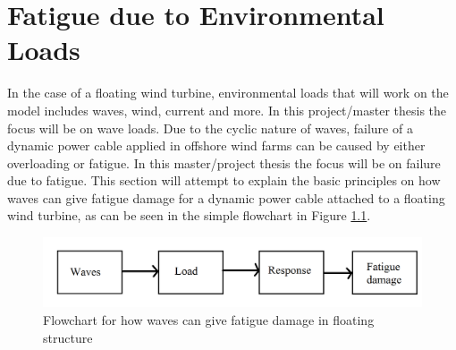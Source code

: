 \chapter{Fatigue due to Environmental Loads}
\label{chap:fatigue}
In the case of a floating wind turbine, environmental loads that will work on the model includes waves, wind, current and more. In this project/master thesis the focus will be on wave loads. Due to the cyclic nature of waves, failure of a dynamic power cable applied in offshore wind farms can be caused by either overloading or fatigue. In this master/project thesis the focus will be on failure due to fatigue. This section will attempt to explain the basic principles on how waves can give fatigue damage for a dynamic power cable attached to a floating wind turbine, as can be seen in the simple flowchart in Figure \ref{fig:flowchart}. 

\begin{figure}[h!]
\centering
\includegraphics[scale=0.4]{figures/box}
\caption[$\; \:$Flowchart]{Flowchart for how waves can give fatigue damage in floating structure}
 \label{fig:flowchart}
\end{figure}

